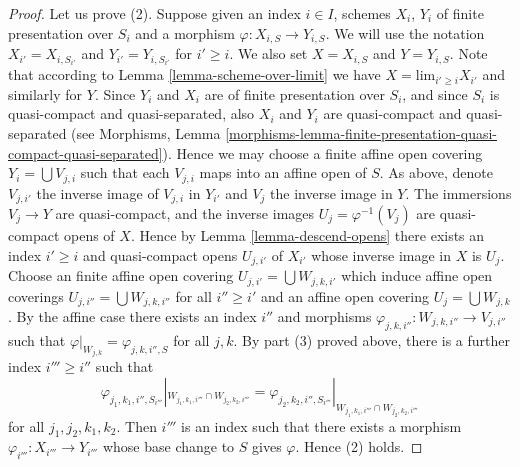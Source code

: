 \begin{proof}
\medskip\noindent
Let us prove (2). Suppose given an index $i \in I$, schemes
$X_i$, $Y_i$ of finite presentation over $S_i$ and a morphism
$\varphi : X_{i, S} \to Y_{i, S}$. We will use the notation
$X_{i'} = X_{i, S_{i'}}$ and $Y_{i'} = Y_{i, S_{i'}}$ for
$i' \geq i$. We also set $X = X_{i, S}$ and $Y = Y_{i, S}$.
Note that according to Lemma \ref{lemma-scheme-over-limit} we have
$X = \text{lim}_{i' \geq i} X_{i'}$ and similarly for $Y$.
Since $Y_i$ and $X_i$ are of finite presentation
over $S_i$, and since $S_i$ is quasi-compact and quasi-separated, also
$X_i$ and $Y_i$ are quasi-compact and quasi-separated
(see Morphisms,
Lemma \ref{morphisms-lemma-finite-presentation-quasi-compact-quasi-separated}).
Hence we may choose a finite affine open covering
$Y_i = \bigcup V_{j, i}$ such that each $V_{j, i}$ maps into
an affine open of $S$. As above, denote $V_{j, i'}$ the inverse
image of $V_{j, i}$ in $Y_{i'}$ and $V_j$ the inverse image in $Y$.
The immersions $V_j \to Y$ are quasi-compact, and the inverse images
$U_j = \varphi^{-1}(V_j)$ are quasi-compact opens of $X$.
Hence by Lemma \ref{lemma-descend-opens} there exists an index
$i' \geq i$ and quasi-compact opens $U_{j, i'}$ of $X_{i'}$
whose inverse image in $X$ is $U_j$. Choose an finite affine open covering
$U_{j, i'} = \bigcup W_{j, k, i'}$ which induce affine open
coverings $U_{j, i''} = \bigcup W_{j, k, i''}$
for all $i'' \geq i'$ and an affine open covering
$U_j = \bigcup W_{j, k}$. By the affine case there exists
an index $i''$ and morphisms
$\varphi_{j, k, i''} : W_{j, k, i''} \to V_{j, i''}$
such that
$\varphi|_{W_{j, k}} = \varphi_{j, k, i'', S}$ for all $j, k$.
By part (3) proved above, there is a further index $i''' \geq i''$
such that
$$
\varphi_{j_1, k_1, i'', S_{i'''}}|_{W_{j_1, k_1, i'''} \cap W_{j_2, k_2, i'''}}
=
\varphi_{j_2, k_2, i'', S_{i'''}}|_{W_{j_1, k_1, i'''} \cap W_{j_2, k_2, i'''}}
$$
for all $j_1, j_2, k_1, k_2$. Then $i'''$ is an index such that
there exists a morphism $\varphi_{i'''} : X_{i'''} \to Y_{i'''}$
whose base change to $S$ gives $\varphi$. Hence (2) holds.


\end{proof}
